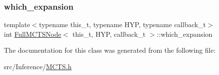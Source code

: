 \subsubsection{\texorpdfstring{which\+\_\+expansion}{which\_expansion}}
{\footnotesize\ttfamily template$<$typename this\+\_\+t, typename H\+YP, typename callback\+\_\+t$>$ \\
int \hyperlink{class_full_m_c_t_s_node}{Full\+M\+C\+T\+S\+Node}$<$ this\+\_\+t, H\+YP, callback\+\_\+t $>$\+::which\+\_\+expansion}



The documentation for this class was generated from the following file\+:\begin{DoxyCompactItemize}
\item 
src/\+Inference/\hyperlink{_m_c_t_s_8h}{M\+C\+T\+S.\+h}\end{DoxyCompactItemize}
